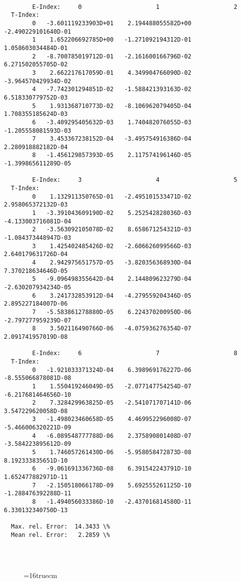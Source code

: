 \documentclass[12pt,dvipdfmx]{article}
\begin{document}
\begin{small}\begin{verbatim}

        E-Index:     0                     1                     2
  T-Index:
        0   -3.601119233903D+01    2.194488055582D+00   -2.490229101640D-01
        1    1.652206692785D+00   -1.271092194312D-01    1.058603034484D-01
        2   -8.700785019712D-01   -2.161600166796D-02    6.271502055705D-02
        3    2.662217617059D-01    4.349904766090D-02   -3.964570429934D-02
        4   -7.742301294851D-02   -1.588421393163D-02    6.518330779752D-03
        5    1.931368710773D-02   -8.106962079405D-04    1.708355185624D-03
        6   -3.409295405632D-03    1.740482076055D-03   -1.205558081593D-03
        7    3.453367238152D-04   -3.495754916386D-04    2.280918882182D-04
        8   -1.456129857393D-05    2.117574196146D-05   -1.399865611289D-05

        E-Index:     3                     4                     5
  T-Index:
        0    1.132911350765D-01   -2.495101533471D-02    2.958065372132D-03
        1   -3.391043609190D-02    5.252542828036D-03   -4.133003716081D-04
        2   -3.563092105078D-02    8.658671254321D-03   -1.084373448947D-03
        3    1.425402485426D-02   -2.606626099566D-03    2.640179631726D-04
        4    2.942975651757D-05   -3.820356368930D-04    7.370218634646D-05
        5   -9.096498355642D-04    2.144809623279D-04   -2.630207934234D-05
        6    3.241732853912D-04   -4.279559204346D-05    2.895227184007D-06
        7   -5.583861278880D-05    6.224370200950D-06   -2.797277959239D-07
        8    3.502116490766D-06   -4.075936276354D-07    2.091741957019D-08

        E-Index:     6                     7                     8
  T-Index:
        0   -1.921033371324D-04    6.398969176227D-06   -8.555066878081D-08
        1    1.550419246049D-05   -2.077147754254D-07   -6.217681464656D-10
        2    7.328429963825D-05   -2.541071707141D-06    3.547229620058D-08
        3   -1.498023460658D-05    4.469952296008D-07   -5.466006320221D-09
        4   -6.089548777788D-06    2.375890801408D-07   -3.584223895612D-09
        5    1.746057261430D-06   -5.958058472873D-08    8.192333835651D-10
        6   -9.061691336736D-08    6.391542243791D-10    1.652477882971D-11
        7   -2.150518066178D-09    5.692555261125D-10   -1.288476392288D-11
        8   -1.494056033386D-10   -2.437016814580D-11    6.330132340750D-13

  Max. rel. Error:  14.3433 \%
  Mean rel. Error:   2.2859 \%




\end{verbatim}\end{small}
\begin{figure} \label{2.2.15a}
\epsfxsize=16truecm
\end{figure}
\newpage
\end{document}
